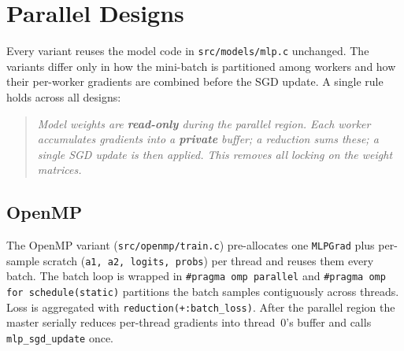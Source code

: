 \documentclass[11pt,a4paper]{article}
\begin{document}
\section{Parallel Designs}\label{sec:designs}

Every variant reuses the model code in \texttt{src/models/mlp.c} unchanged.
The variants differ only in how the mini-batch is partitioned among
workers and how their per-worker gradients are combined before the SGD
update. A single rule holds across all designs:

\begin{quote}
\textit{Model weights are \textbf{read-only} during the parallel region.
Each worker accumulates gradients into a \textbf{private} buffer; a
reduction sums these; a single SGD update is then applied. This removes
all locking on the weight matrices.}
\end{quote}

\subsection{OpenMP}\label{sec:openmp}

The OpenMP variant (\texttt{src/openmp/train.c}) pre-allocates one
\texttt{MLPGrad} plus per-sample scratch (\texttt{a1, a2, logits, probs})
per thread and reuses them every batch. The batch loop is wrapped in
\verb|#pragma omp parallel| and \verb|#pragma omp for schedule(static)|
partitions the batch samples contiguously across threads. Loss is
aggregated with \verb|reduction(+:batch_loss)|. After the parallel region
the master serially reduces per-thread gradients into thread~0's buffer
and calls \texttt{mlp\_sgd\_update} once.
\end{document}
